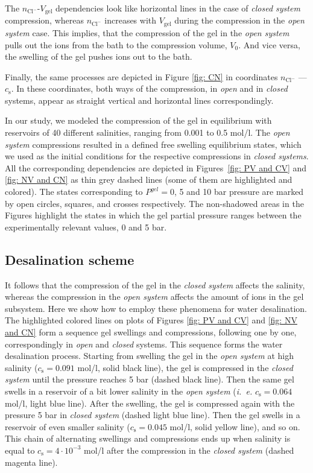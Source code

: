 \documentclass[journal,article,submit,pdftex,moreauthors]{Definitions/mdpi}
\newcommand{\ie}{\textit{i.~e.} }
\newcommand{\ncl}{n_\mathrm{Cl^-}}
\newcommand{\cs}{c_{\mathrm{s}}}
\newcommand{\Vgel}{V_\mathrm{gel}}
\newcommand{\Vbox}{V_0}
\begin{document}
The $\ncl$-$\Vgel$ dependencies look like horizontal lines in the case of \emph{closed system} compression,
whereas $\ncl$ increases with $\Vgel$ during the compression in the \emph{open system} case. 
This implies, that the compression of the gel in the \emph{open system} pulls out the ions from the bath to the compression volume, $\Vbox$. 
And vice versa, the swelling of the gel pushes ions out to the bath.

Finally, the same processes are depicted in Figure \ref{fig: CN} in coordinates $\ncl$ --- $\cs$. 
In these coordinates, both ways of the compression, in \emph{open} and in \emph{closed} systems, appear as straight vertical and horizontal lines correspondingly. 

In our study, we modeled the compression of the gel in equilibrium with reservoirs of 40 different salinities, ranging from 0.001 to 0.5 mol/l. 
The \emph{open system} compressions resulted in a defined free swelling equilibrium states,
which we used as the initial conditions for the respective compressions in \emph{closed systems}. 
All the corresponding dependencies are depicted in Figures~\ref{fig: PV and CV} and \ref{fig: NV and CN} as thin grey dashed lines (some of them are highlighted and colored).
The states corresponding to $P^{gel}=0$, 5 and 10 bar pressure are marked by open circles, squares, and crosses respectively. 
The non-shadowed areas in the Figures highlight the states in which the gel partial pressure ranges between the experimentally relevant values, 0 and 5 bar.

\subsection{Desalination scheme}
It follows that the compression of the gel in the \emph{closed system} affects the salinity, whereas the compression in the \emph{open system} affects the amount of ions in the gel subsystem. 
Here we show how to employ these phenomena for water desalination. 
The highlighted colored lines on plots of Figures \ref{fig: PV and CV} and \ref{fig: NV and CN} form a sequence gel swellings and compressions, following one by one, correspondingly in \emph{open} and \emph{closed} systems. 
This sequence forms the water desalination process.
Starting from swelling the gel in the \emph{open system} at high salinity ($\cs=0.091$ mol/l, solid black line), the gel is compressed in the \emph{closed system} until the pressure reaches 5 bar (dashed black line). 
Then the same gel swells in a reservoir of a bit lower salinity in the \emph{open system} (\ie $\cs=0.064$ mol/l, light blue line). 
After the swelling, the gel is compressed again with the pressure 5 bar in \emph{closed system} (dashed light blue line).  
Then the gel swells in a reservoir of even smaller salinity ($\cs=0.045$ mol/l, solid yellow line), and so on. 
This chain of alternating swellings and compressions ends up when salinity is equal to $\cs=4\cdot10^{-3}$ mol/l after the compression in the \emph{closed system} (dashed magenta line).
\end{document}
